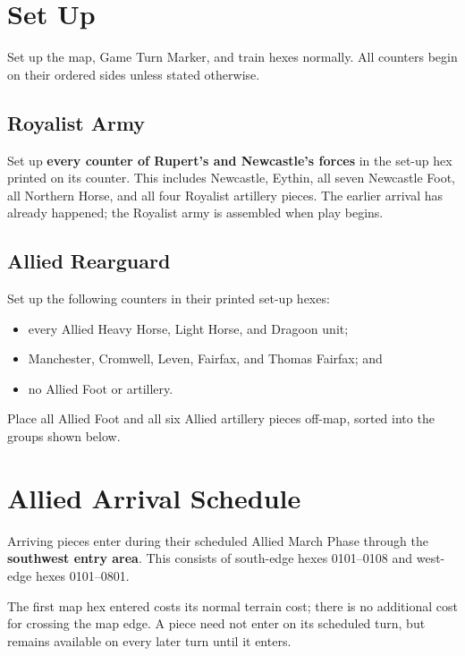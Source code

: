 \section{Set Up}

Set up the map, Game Turn Marker, and train hexes normally. All counters begin
on their ordered sides unless stated otherwise.

\subsection{Royalist Army}

Set up \textbf{every counter of Rupert's and Newcastle's forces} in the set-up
hex printed on its counter. This includes Newcastle, Eythin, all seven Newcastle
Foot, all Northern Horse, and all four Royalist artillery pieces. The earlier
arrival has already happened; the Royalist army is assembled when play begins.

\subsection{Allied Rearguard}

Set up the following counters in their printed set-up hexes:

\begin{itemize}
  \item every Allied Heavy Horse, Light Horse, and Dragoon unit;
  \item Manchester, Cromwell, Leven, Fairfax, and Thomas Fairfax; and
  \item no Allied Foot or artillery.
\end{itemize}

Place all Allied Foot and all six Allied artillery pieces off-map, sorted into
the groups shown below.

\section{Allied Arrival Schedule}

Arriving pieces enter during their scheduled Allied March Phase through the
\textbf{southwest entry area}. This consists of south-edge hexes
0101--0108 and west-edge hexes 0101--0801.

The first map hex entered costs its normal terrain cost; there is no additional
cost for crossing the map edge. A piece need not enter on its scheduled turn,
but remains available on every later turn until it enters.

